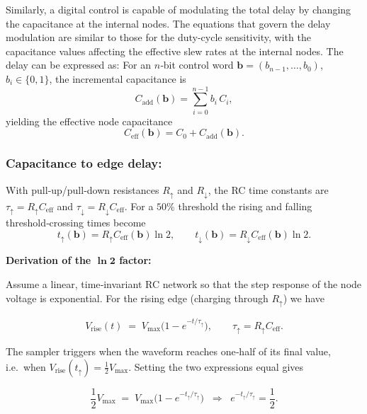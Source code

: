 
Similarly, a digital control is capable of modulating the total delay by changing the capacitance at the internal nodes. The equations that govern the delay modulation are similar to those for the duty-cycle sensitivity, with the capacitance values affecting the effective slew rates at the internal nodes. The delay can be expressed as:
For an $n$‑bit control word
$\mathbf{b}=(b_{n-1},\ldots,b_0)$, $b_i\!\in\!\{0,1\}$,
the incremental capacitance is
\[
C_{\mathrm{add}}(\mathbf{b})=\sum_{i=0}^{n-1} b_i\,C_i,
\]
yielding the effective node capacitance
\begin{equation}
C_{\mathrm{eff}}(\mathbf{b}) = C_0 + C_{\mathrm{add}}(\mathbf{b}).
\label{eq:C_eff}
\end{equation}

\subsubsection{Capacitance to edge delay:}

With pull‑up/pull‑down resistances $R_{\uparrow}$ and $R_{\downarrow}$,
the RC time constants are
$\tau_{\uparrow}=R_{\uparrow}C_{\mathrm{eff}}$ and
$\tau_{\downarrow}=R_{\downarrow}C_{\mathrm{eff}}$.
For a $50\%$ threshold the
rising and falling threshold‑crossing times become
\begin{equation}
t_{\uparrow}(\mathbf{b}) = R_{\uparrow}C_{\mathrm{eff}}(\mathbf{b})\ln 2,
\qquad
t_{\downarrow}(\mathbf{b}) = R_{\downarrow}C_{\mathrm{eff}}(\mathbf{b})\ln 2.
\label{eq:t_r_f}
\end{equation}

\textbf{Derivation of the \(\boldsymbol{\ln 2}\) factor:}

Assume a linear, time‑invariant RC network so that the step response of the
node voltage is exponential.  For the rising edge (charging through
\(R_{\uparrow}\)) we have

\[
V_\text{rise}(t) \;=\; V_{\max}\!\bigl(1-e^{-t/\tau_{\uparrow}}\bigr),
\qquad
\tau_{\uparrow}=R_{\uparrow}C_{\mathrm{eff}}.
\]

The sampler triggers when the waveform reaches one‑half of its final value,
i.e.\ when \(V_\text{rise}(t_{\uparrow})=\tfrac{1}{2}V_{\max}\).  Setting
the two expressions equal gives

\[
\frac{1}{2}V_{\max}
      \;=\;
      V_{\max}\bigl(1-e^{-t_{\uparrow}/\tau_{\uparrow}}\bigr)
\;\;\Longrightarrow\;\;
e^{-t_{\uparrow}/\tau_{\uparrow}} = \frac{1}{2}.
\]

